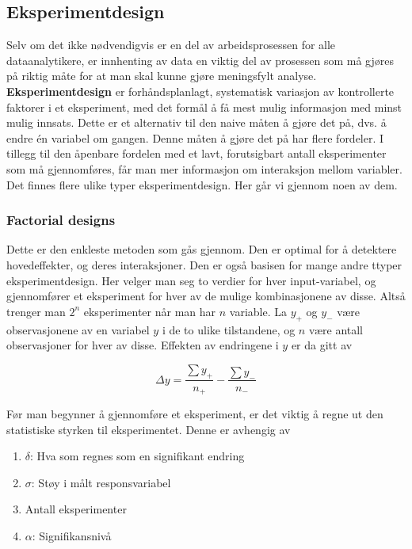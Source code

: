 \subsection{Eksperimentdesign}
Selv om det ikke nødvendigvis er en del av arbeidsprosessen for alle dataanalytikere, er innhenting av data en viktig del av prosessen som må gjøres på riktig måte for at man skal kunne gjøre meningsfylt analyse. \textbf{Eksperimentdesign} er forhåndsplanlagt, systematisk variasjon av kontrollerte faktorer i et eksperiment, med det formål å få mest mulig informasjon med minst mulig innsats. Dette er et alternativ til den naive måten å gjøre det på, dvs. å endre én variabel om gangen. Denne måten å gjøre det på har flere fordeler. I tillegg til den åpenbare fordelen med et lavt, forutsigbart antall eksperimenter som må gjennomføres, får man mer informasjon om interaksjon mellom variabler. Det finnes flere ulike typer eksperimentdesign. Her går vi gjennom noen av dem.

\subsubsection{Factorial designs}
Dette er den enkleste metoden som gås gjennom. Den er optimal for å detektere hovedeffekter, og deres interaksjoner. Den er også basisen for mange andre ttyper eksperimentdesign. Her velger man seg to verdier for hver input-variabel, og gjennomfører et eksperiment for hver av de mulige kombinasjonene av disse. Altså trenger man $2^n$ eksperimenter når man har $n$ variable. La $y_+$ og $y_-$ være observasjonene av en variabel $y$ i de to ulike tilstandene, og $n$ være antall observasjoner for hver av disse. Effekten av endringene i $y$ er da gitt av

\begin{equation}
	\Delta y = \frac{\sum y_+} {n_+} - \frac{\sum y_-}{n_-}
\end{equation}

Før man begynner å gjennomføre et eksperiment, er det viktig å regne ut 
den statistiske styrken til eksperimentet. Denne er avhengig av

\begin{enumerate}
	\item $\delta$: Hva som regnes som en signifikant endring 
	\item $\sigma$: Støy i målt responsvariabel
	\item Antall eksperimenter
	\item $\alpha$: Signifikansnivå
\end{enumerate}

